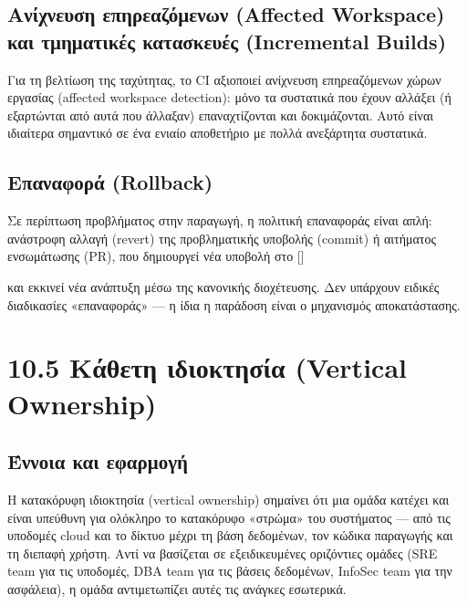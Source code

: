 \documentclass[11pt,a4paper,greek,twoside]{template-xe}
\let\origtexttt\texttt
\renewcommand{\texttt}[1]{%
  \begingroup
  \StrSubstitute{#1}{.}{.\allowbreak}[\tttmp]%
  \origtexttt{\tttmp}%
  \endgroup
}
\begin{document}
\subsection{Ανίχνευση επηρεαζόμενων (Affected Workspace) και τμηματικές
κατασκευές (Incremental
Builds)}\label{ux3b1ux3bdux3afux3c7ux3bdux3b5ux3c5ux3c3ux3b7-ux3b5ux3c0ux3b7ux3c1ux3b5ux3b1ux3b6ux3ccux3bcux3b5ux3bdux3c9ux3bd-affected-workspace-ux3baux3b1ux3b9-ux3c4ux3bcux3b7ux3bcux3b1ux3c4ux3b9ux3baux3adux3c2-ux3baux3b1ux3c4ux3b1ux3c3ux3baux3b5ux3c5ux3adux3c2-incremental-builds}

Για τη βελτίωση της ταχύτητας, το CI αξιοποιεί ανίχνευση επηρεαζόμενων
χώρων εργασίας (affected workspace detection): μόνο τα συστατικά που
έχουν αλλάξει (ή εξαρτώνται από αυτά που άλλαξαν) επαναχτίζονται και
δοκιμάζονται. Αυτό είναι ιδιαίτερα σημαντικό σε ένα ενιαίο αποθετήριο με
πολλά ανεξάρτητα συστατικά.

\subsection{Επαναφορά
(Rollback)}\label{ux3b5ux3c0ux3b1ux3bdux3b1ux3c6ux3bfux3c1ux3ac-rollback}

Σε περίπτωση προβλήματος στην παραγωγή, η πολιτική επαναφοράς είναι
απλή: ανάστροφη αλλαγή (revert) της προβληματικής υποβολής (commit) ή
αιτήματος ενσωμάτωσης (PR), που δημιουργεί νέα υποβολή στο \texttt{main}
και εκκινεί νέα ανάπτυξη μέσω της κανονικής διοχέτευσης. Δεν υπάρχουν
ειδικές διαδικασίες «επαναφοράς» --- η ίδια η παράδοση είναι ο
μηχανισμός αποκατάστασης.

\section{10.5 Κάθετη ιδιοκτησία (Vertical
Ownership)}\label{ux3baux3acux3b8ux3b5ux3c4ux3b7-ux3b9ux3b4ux3b9ux3bfux3baux3c4ux3b7ux3c3ux3afux3b1-vertical-ownership}

\subsection{Έννοια και
εφαρμογή}\label{ux3adux3bdux3bdux3bfux3b9ux3b1-ux3baux3b1ux3b9-ux3b5ux3c6ux3b1ux3c1ux3bcux3bfux3b3ux3ae}

Η κατακόρυφη ιδιοκτησία (vertical ownership) σημαίνει ότι μια ομάδα
κατέχει και είναι υπεύθυνη για ολόκληρο το κατακόρυφο «στρώμα» του
συστήματος --- από τις υποδομές cloud και το δίκτυο μέχρι τη βάση
δεδομένων, τον κώδικα παραγωγής και τη διεπαφή χρήστη. Αντί να βασίζεται
σε εξειδικευμένες οριζόντιες ομάδες (SRE team για τις υποδομές, DBA team
για τις βάσεις δεδομένων, InfoSec team για την ασφάλεια), η ομάδα
αντιμετωπίζει αυτές τις ανάγκες εσωτερικά.
\end{document}
